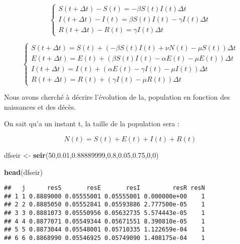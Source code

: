 \documentclass[
]{article}
\newenvironment{Shaded}{\begin{snugshade}}{\end{snugshade}}
\newcommand{\DecValTok}[1]{\textcolor[rgb]{0.00,0.00,0.81}{#1}}
\newcommand{\FloatTok}[1]{\textcolor[rgb]{0.00,0.00,0.81}{#1}}
\newcommand{\KeywordTok}[1]{\textcolor[rgb]{0.13,0.29,0.53}{\textbf{#1}}}
\newcommand{\NormalTok}[1]{#1}
\newcommand{\StringTok}[1]{\textcolor[rgb]{0.31,0.60,0.02}{#1}}
\begin{document}
\[\begin{equation}
    \left\{
     \begin{array}{l}
        S(t + \Delta t) -S(t) = - \beta S(t)  I(t) \Delta t\\
        I(t + \Delta t) -I(t) = \beta S(t)  I(t) - \gamma  I(t) \Delta t\\
        R(t + \Delta t) -R(t) = \gamma I(t) \Delta t
      \end{array}
    \right.
\end{equation}\]

\[\begin{equation}
    \left\{
     \begin{array}{l}
        S(t + \Delta t)  = S(t) + (- \beta S(t) I(t) + \nu N(t) - \mu S(t)) \Delta t\\
        E(t + \Delta t)  = E(t) + ( \beta S(t) I(t) - \alpha E(t) - \mu E(t)) \Delta t\\
        I(t + \Delta t)  = I(t) + ( \alpha E(t) - \gamma I(t) - \mu I(t)) \Delta t\\
        R(t + \Delta t)  = R(t) + (\gamma I(t) - \mu R(t)) \Delta t
      \end{array}
    \right.
\end{equation}\]

Nous avons cherché à décrire l'évolution de la, population en fonction
des naissances et des décès.

On sait qu'a un instant t, la taille de la population sera :

\[N(t)=S(t)+E(t)+I(t)+R(t)\]

\begin{Shaded}
\begin{Highlighting}[]
\NormalTok{dfseir <-}\StringTok{ }\KeywordTok{seir}\NormalTok{(}\DecValTok{50}\NormalTok{,}\FloatTok{0.01}\NormalTok{,}\FloatTok{0.88889999}\NormalTok{,}\FloatTok{0.8}\NormalTok{,}\FloatTok{0.05}\NormalTok{,}\FloatTok{0.75}\NormalTok{,}\DecValTok{0}\NormalTok{,}\DecValTok{0}\NormalTok{)}

\KeywordTok{head}\NormalTok{(dfseir)}
\end{Highlighting}
\end{Shaded}

\begin{verbatim}
##   j      resS       resE       resI         resR resN
## 1 1 0.8889000 0.05555001 0.05555001 0.000000e+00    1
## 2 2 0.8885050 0.05552841 0.05593886 2.777500e-05    1
## 3 3 0.8881073 0.05550956 0.05632735 5.574443e-05    1
## 4 4 0.8877071 0.05549344 0.05671551 8.390810e-05    1
## 5 5 0.8873044 0.05548001 0.05710335 1.122659e-04    1
## 6 6 0.8868990 0.05546925 0.05749090 1.408175e-04    1
\end{verbatim}
\end{document}
